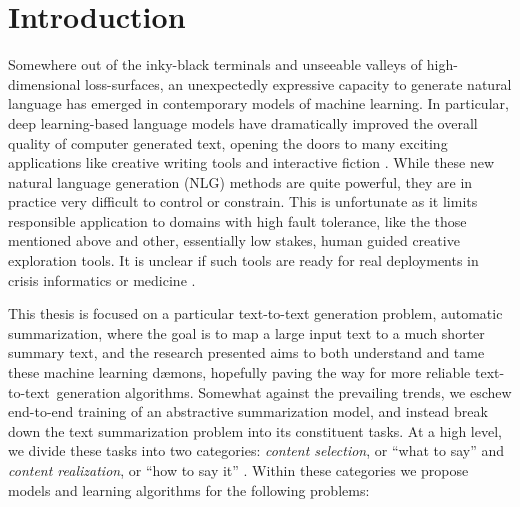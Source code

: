\chapter{Introduction}



\addvspace{6\bigskipamount}

Somewhere out of the inky-black terminals and  unseeable valleys of
high-dimensional loss-surfaces, an unexpectedly expressive capacity to generate
natural language has emerged in contemporary models of machine learning.  In
particular, deep learning-based language models have dramatically improved the
overall quality of computer generated text, opening the doors to many exciting
applications like creative writing tools
\citep{huggingface2019,samuel2019,seabrook2019} and interactive fiction
\citep{robertson2019}.  While these new natural language generation (NLG)
methods are quite powerful, they are in practice very difficult to control or
constrain. This is unfortunate as it limits responsible application to domains
with high fault tolerance, like the those mentioned above and other,
essentially low stakes, human guided creative exploration tools. It is unclear
if such tools are ready for real deployments in crisis informatics
\citep{starbird2013} or medicine \citep{gatt2009}.

This thesis is focused on a particular text-to-text generation problem,
automatic summarization, where the goal is to map a large input text to a much
shorter summary text, and the research presented aims to both understand and
tame these machine learning d{\ae}mons, hopefully paving the way for more
reliable text-to-text~generation algorithms.  Somewhat against the prevailing
trends, we eschew end-to-end training of an abstractive summarization model,
and instead break down the text summarization problem into its constituent
tasks.  At a high level, we divide these tasks into two categories:
\textit{content selection}, or ``what to say'' and \textit{content
realization}, or ``how to say it'' \citep{mckeown1985}.  Within these
categories we propose models and learning algorithms for the following
problems:
    
